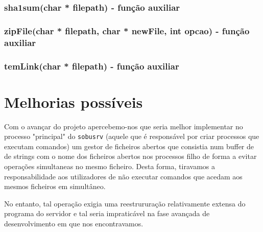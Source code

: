 \subsubsection{ sha1sum(char * filepath) - função auxiliar}

\subsubsection{ zipFile(char * filepath, char * newFile, int opcao) - função auxiliar}
\subsubsection{ temLink(char * filepath) - função auxiliar}

\section{Melhorias possíveis}
Com o avançar do projeto apercebemo-nos que seria melhor implementar no processo "principal" do \texttt{sobusrv} 
(aquele que é responsável por criar processos que executam comandos) um gestor de ficheiros abertos que consistia num buffer de 
de strings com o nome dos ficheiros abertos nos processos filho de forma a evitar operações simultaneas no mesmo ficheiro. 
Desta forma, tiravamos a responsabilidade aos utilizadores de não executar comandos que acedam aos mesmos ficheiros em simultâneo.

No entanto, tal operação exigia uma reestrururação relativamente extensa do programa do servidor e tal seria impraticável na fase avançada
de desenvolvimento em que nos encontravamos.
